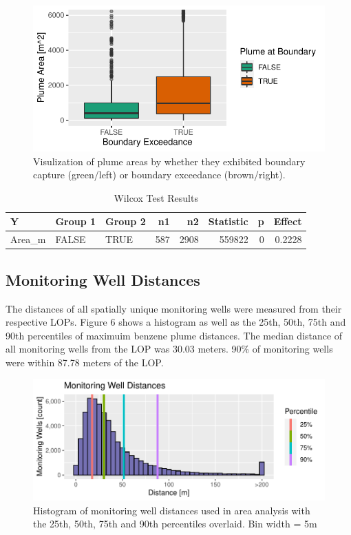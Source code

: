\documentclass[draft,linenumbers]{agujournal2018}
\begin{document}
\begin{figure}[!h]
\includegraphics{CA_Benzene_Plumes_files/figure-latex/plumeAreaCompare-1} \caption{Visulization of plume areas by whether they exhibited boundary capture (green/left) or boundary exceedance (brown/right).}\label{fig:plumeAreaCompare}
\end{figure}
\begin{table}[H]

\caption{\label{tab:wilcox}Wilcox Test Results}
\centering
\begin{tabular}[t]{l|l|l|r|r|r|r|r}
\hline
Y & Group 1 & Group 2 & n1 & n2 & Statistic & p & Effect\\
\hline
Area\_m & FALSE & TRUE & 587 & 2908 & 559822 & 0 & 0.2228\\
\hline
\end{tabular}
\end{table}

\subsection{Monitoring Well Distances}

The distances of all spatially unique monitoring wells were measured
from their respective LOPs. Figure 6 shows a histogram as well as the
25th, 50th, 75th and 90th percentiles of maximuim benzene plume
distances. The median distance of all monitoring wells from the LOP was
30.03 meters. 90\% of monitoring wells were within 87.78 meters of the
LOP.

\begin{figure}[!h]
\includegraphics{CA_Benzene_Plumes_files/figure-latex/mwDistsPlot-1} \caption{Histogram of monitoring well distances used in area analysis with the 25th, 50th, 75th and 90th percentiles overlaid. Bin width = 5m}\label{fig:mwDistsPlot}
\end{figure}
\end{document}
